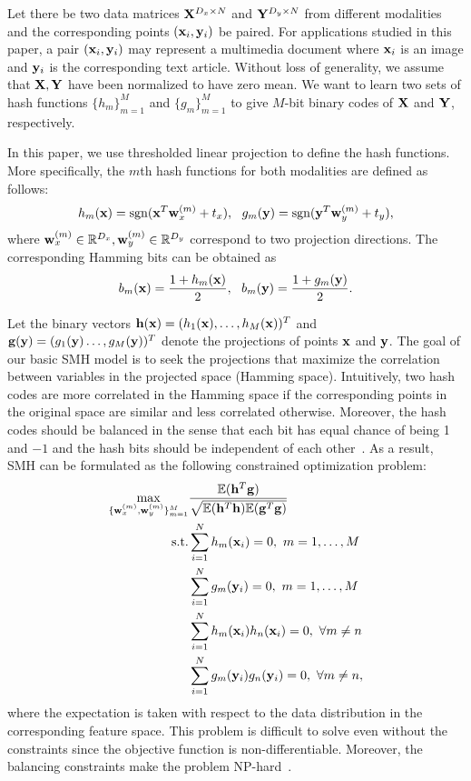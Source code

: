 Let there be two data matrices ${\bf X}^{D_x\times N}$ and ${\bf Y}^{D_y\times N}$ from different modalities and the corresponding points $({\bf x}_i,{\bf y}_i)$ be paired. For applications studied in this paper, a pair $({\bf x}_i,{\bf y}_i)$ may represent a multimedia document where ${\bf x}_i$ is an image and ${\bf y}_i$ is the corresponding text article. Without loss of generality, we assume that ${\bf X},{\bf Y}$ have been normalized to have zero mean. We want to learn two sets of hash functions $\{h_{m}\}_{m=1}^{M}$ and $\{g_{m}\}_{m=1}^{M}$ to give $M$-bit binary codes of ${\bf X}$ and ${\bf Y}$, respectively. 

In this paper, we use thresholded linear projection to define the hash functions. More specifically, the $m$th hash functions for both modalities are defined as follows:
\begin{align}
h_{m}(\x)=\sgn(\x^T\w_{x}^{(m)}+t_x),\ \ %
g_{m}(\y)=\sgn(\y^T\w_{y}^{(m)}+t_y)\nonumber,
\end{align}
where ${\bf w}_{x}^{(m)}\in\mathbb{R}^{D_{x}},{\bf w}_{y}^{(m)}\in\mathbb{R}^{D_{y}}$ correspond to two projection directions. The corresponding Hamming bits can be obtained as
\begin{align}
\label{eqn:bit}
b_{m}(\x) = \frac{1+h_{m}(\x)}{2}, \ \ 
b_{m}(\y)= \frac{1+g_{m}(\y)}{2}.
\end{align}

Let the binary vectors ${\bf h}({\bf x}) = (h_{1}({\bf x}),\dots,h_{M}({\bf x}))^T$ and ${\bf g}({\bf y}) = (g_{1}({\bf y})\dots,g_{M}({\bf y}))^T$ denote the projections of points ${\bf x}$ and ${\bf y}$.  
The goal of our basic \mbox{SMH} model is to seek the projections that maximize the correlation between variables in the projected space (Hamming space). Intuitively, two hash codes are more correlated in the Hamming space if the corresponding points in the original space are similar and less correlated otherwise. Moreover, the hash codes should be balanced in the sense that each bit has equal chance of being 1 and $-1$ and the hash bits should be independent of each other~\cite{weiss2008nips}. As a result, \mbox{SMH} can be formulated as the following constrained optimization problem:
\begin{eqnarray}
\max_{\{{\bf w}_{x}^{(m)},{\bf w}_{y}^{(m)}\}_{m=1}^{M}}& \frac{\mathbb{E}({\bf h}^{T}{\bf g})}{\sqrt{\mathbb{E}({\bf h}^{T}{\bf h})\mathbb{E}({\bf g}^{T}{\bf g})}}\\
\mathop{\rm s.t.}&  \sum_{i=1}^N h_{m}({\bf x}_i) =0, \ m=1,\dots,M\nonumber\\
&\sum_{i=1}^N g_{m}({\bf y}_i) =0, \ m=1,\dots,M\nonumber\\
&\sum_{i=1}^{N}h_{m}({\bf x}_i)h_{n}({\bf x}_i) =0, \ \forall m\neq n\nonumber\\
&\sum_{i=1}^{N}g_{m}({\bf y}_i)g_{n}({\bf y}_i) =0, \ \forall m\neq n,\nonumber
\label{eqn:cmh1}
\end{eqnarray}
where the expectation is taken with respect to the data distribution in the corresponding feature space. This problem is difficult to solve even without the constraints since the objective function is non-differentiable. Moreover, the balancing constraints make the problem NP-hard~\cite{weiss2008nips}.

